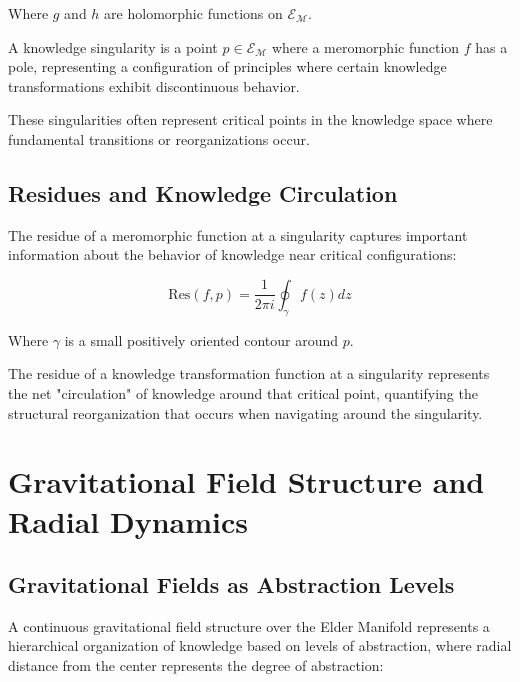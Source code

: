 Where $g$ and $h$ are holomorphic functions on $\mathcal{E}_{\mathcal{M}}$.

\begin{definition}
A knowledge singularity is a point $p \in \mathcal{E}_{\mathcal{M}}$ where a meromorphic function $f$ has a pole, representing a configuration of principles where certain knowledge transformations exhibit discontinuous behavior.
\end{definition}

These singularities often represent critical points in the knowledge space where fundamental transitions or reorganizations occur.

\subsection{Residues and Knowledge Circulation}

The residue of a meromorphic function at a singularity captures important information about the behavior of knowledge near critical configurations:

\begin{equation}
\text{Res}(f, p) = \frac{1}{2\pi i}\oint_{\gamma} f(z) dz
\end{equation}

Where $\gamma$ is a small positively oriented contour around $p$.

\begin{theorem}
The residue of a knowledge transformation function at a singularity represents the net "circulation" of knowledge around that critical point, quantifying the structural reorganization that occurs when navigating around the singularity.
\end{theorem}

\section{Gravitational Field Structure and Radial Dynamics}

\subsection{Gravitational Fields as Abstraction Levels}

A continuous gravitational field structure over the Elder Manifold represents a hierarchical organization of knowledge based on levels of abstraction, where radial distance from the center represents the degree of abstraction:

